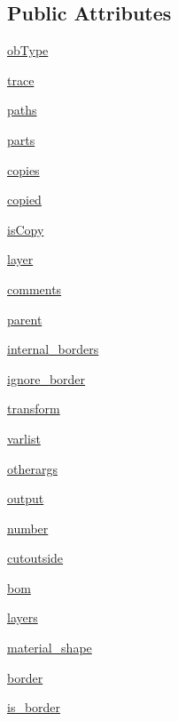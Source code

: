 \subsection*{Public Attributes}
\begin{DoxyCompactItemize}
\item 
\hyperlink{classpath_1_1_part_ac56a35fa54fc9cae4b96917ef5bcdaae}{ob\+Type}
\item 
\hyperlink{classpath_1_1_part_aa46bbe5ca2996ee60e388415f398b008}{trace}
\item 
\hyperlink{classpath_1_1_part_af1c81df8b50b76bba5e7be33d8a12938}{paths}
\item 
\hyperlink{classpath_1_1_part_a01ea69c0b818956e26ed146808d6ba74}{parts}
\item 
\hyperlink{classpath_1_1_part_a3d990ca845c23f206bc56224737440fd}{copies}
\item 
\hyperlink{classpath_1_1_part_a620639c9a733ef0f168a7c94ccae9cd8}{copied}
\item 
\hyperlink{classpath_1_1_part_a5d3e9b6b69c5eb6b100dfbf7d7fdf488}{is\+Copy}
\item 
\hyperlink{classpath_1_1_part_aa1d9912dfa1d7e3222df898d2a18786f}{layer}
\item 
\hyperlink{classpath_1_1_part_aa94d1de86a82e8b96113c305c1ff63cc}{comments}
\item 
\hyperlink{classpath_1_1_part_aac66c946dd230e64e4c24cecf1d2d4e9}{parent}
\item 
\hyperlink{classpath_1_1_part_ab4eb93506a42db0b4d21000dceca0e91}{internal\+\_\+borders}
\item 
\hyperlink{classpath_1_1_part_a62650bf6a83e3063d90f7e2711784a10}{ignore\+\_\+border}
\item 
\hyperlink{classpath_1_1_part_a77dd1289501d1f4bce4ff5b4718f7200}{transform}
\item 
\hyperlink{classpath_1_1_part_a56b959045a54830e9c1f99675b12a075}{varlist}
\item 
\hyperlink{classpath_1_1_part_ae705ca5412f4383b77dd32e9ebdd237f}{otherargs}
\item 
\hyperlink{classpath_1_1_part_a6ff6c586832ff637508796a8a77dbbac}{output}
\item 
\hyperlink{classpath_1_1_part_a5c83f575732c5a3a949c1e7facbf548c}{number}
\item 
\hyperlink{classpath_1_1_part_a57d1d3471b332024af5cdc8265b96ef1}{cutoutside}
\item 
\hyperlink{classpath_1_1_part_a889c4d521b52576b5b4e96ce573ea602}{bom}
\item 
\hyperlink{classpath_1_1_part_adcfeed4d6166f35e3ea1eb87926f6a5e}{layers}
\item 
\hyperlink{classpath_1_1_part_a982bb6775f254fd811f03015c7695718}{material\+\_\+shape}
\item 
\hyperlink{classpath_1_1_part_a004c78655a7f215ff512e4b18e48b0fe}{border}
\item 
\hyperlink{classpath_1_1_part_abd77fe962ddd912e766b8a2e9220717b}{is\+\_\+border}
\end{DoxyCompactItemize}


